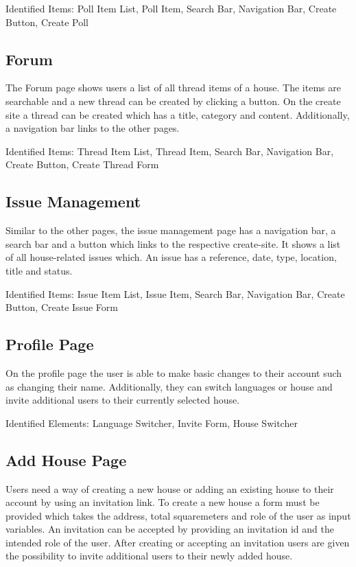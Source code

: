 Identified Items: Poll Item List, Poll Item, Search Bar, Navigation Bar, Create Button, Create Poll

\subsection{Forum}
The Forum page shows users a list of all thread items of a house. The items are searchable and a new thread can be created by clicking a button. On the create site a thread can be created which has a title, category and content. Additionally, a navigation bar links to the other pages.

Identified Items: Thread Item List, Thread Item, Search Bar, Navigation Bar, Create Button, Create Thread Form

\subsection{Issue Management}
Similar to the other pages, the issue management page has a navigation bar, a search bar and a button which links to the respective create-site. It shows a list of all house-related issues which. An issue has a reference, date, type, location, title and status.

Identified Items: Issue Item List, Issue Item, Search Bar, Navigation Bar, Create Button, Create Issue Form

\subsection{Profile Page}
On the profile page the user is able to make basic changes to their account such as changing their name. Additionally, they can switch languages or house and invite additional users to their currently selected house. \newline

Identified Elements: Language Switcher, Invite Form, House Switcher

\subsection{Add House Page}
Users need a way of creating a new house or adding an existing house to their account by using an invitation link. To create a new house a form must be provided which takes the address, total squaremeters and role of the user as input variables. An invitation can be accepted by providing an invitation id and the intended role of the user. After creating or accepting an invitation users are given the possibility to invite additional users to their newly added house. \newline

